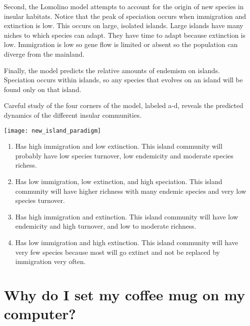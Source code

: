 \documentclass[letterpaper]{tufte-handout}
\begin{document}
Second, the Lomolino model attempts to account for the origin of new species in insular habitats.  Notice that the peak of speciation occurs when immigration and extinction is low.  This occurs on large, isolated islands. Large islands have many niches to which species can adapt. They have time to adapt because extinction is low. Immigration is low so gene flow is limited or absent so the population can diverge from the mainland.

Finally, the model predicts the relative amounts of endemism on islands. Speciation occurs within islands, so any species that evolves on an island will be found only on that island.

Careful study of the four corners of the model, labeled a-d, reveals the predicted dynamics of the different insular communities.
\begin{marginfigure}%
	\texttt{[image: new\_island\_paradigm]}
\end{marginfigure} 

\begin{enumerate}[a:]
	\item Has high immigration and low extinction.  This island community will probably have low species turnover, low endemicity and moderate species richess.

	\item Has low immigration, low extinction, and high speciation. This island community will have higher richness with many endemic species and very low species turnover.

	\item Has high immigration and extinction. This island community will have low endemicity and high turnover, and low to moderate richness.

	\item Has low immigration and high extinction.  This island community will have very few species because most will go extinct and not be replaced by immigration very often. 
\end{enumerate}
\vspace{5cm}
\section{Why do I set my coffee mug on my computer?}
\end{document}
